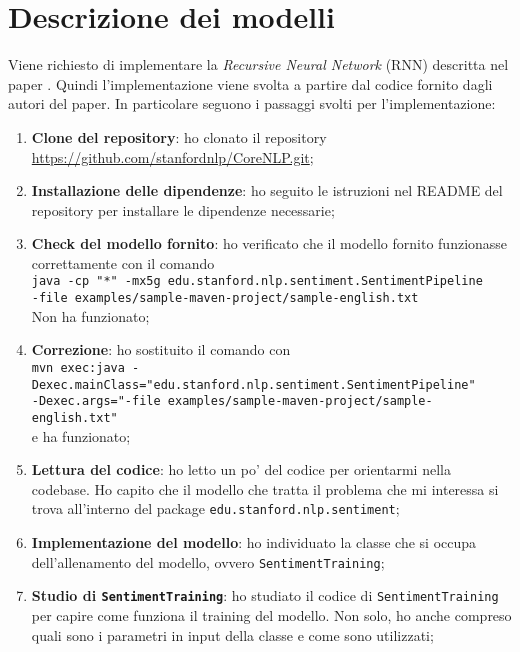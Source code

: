 \section{Descrizione dei modelli}

Viene richiesto di implementare la \textit{Recursive Neural Network} (RNN)
descritta nel paper \cite{socher-etal-2013-recursive}. Quindi l'implementazione
viene svolta a partire dal codice fornito dagli autori del paper. In particolare
seguono i passaggi svolti per l'implementazione:
\begin{enumerate}
	\item \textbf{Clone del repository}: ho clonato il repository
		\url{https://github.com/stanfordnlp/CoreNLP.git};

	\item \textbf{Installazione delle dipendenze}: ho seguito le istruzioni nel
		README del repository per installare le dipendenze necessarie;

	\item \textbf{Check del modello fornito}: ho verificato che il modello
		fornito funzionasse correttamente con il comando\\
		\texttt{java -cp "*" -mx5g edu.stanford.nlp.sentiment.SentimentPipeline \\ 
		-file examples/sample-maven-project/sample-english.txt}\\
		Non ha funzionato;

	\item \textbf{Correzione}: ho sostituito il comando con \\
		\texttt{mvn exec:java
		-Dexec.mainClass="edu.stanford.nlp.sentiment.SentimentPipeline" \\
		-Dexec.args="-file examples/sample-maven-project/sample-english.txt"}\\
		e ha funzionato;

	\item \textbf{Lettura del codice}: ho letto un po' del codice per orientarmi
		nella codebase. Ho capito che il modello che tratta il problema che mi
		interessa si trova all'interno del package 
		\texttt{edu.stanford.nlp.sentiment};

	\item \textbf{Implementazione del modello}: ho individuato la classe che
		si occupa dell'allenamento del modello, ovvero
		\texttt{SentimentTraining};

	\item \textbf{Studio di \texttt{SentimentTraining}}: ho studiato il codice
		di \texttt{SentimentTraining} per capire come funziona il training del
		modello. Non solo, ho anche compreso quali sono i parametri in input
		della classe e come sono utilizzati; 


\end{enumerate}
